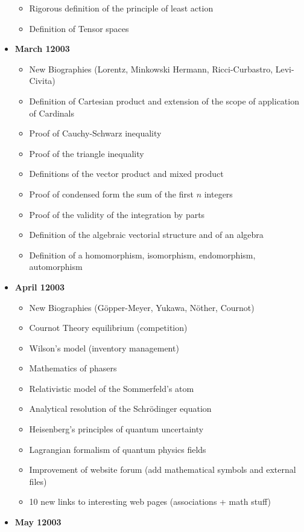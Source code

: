 \begin{itemize}
\begin{itemize}[noitemsep]
			\item Rigorous definition of the principle of least action
			\item Definition of Tensor spaces
			\end{itemize}
	\item \textbf{March 12003}
		\begin{itemize}[noitemsep]
			\item New Biographies (Lorentz, Minkowski Hermann, Ricci-Curbastro, Levi-Civita)
			\item Definition of Cartesian product and extension of the scope of application of Cardinals
			\item Proof of Cauchy-Schwarz inequality
			\item Proof of the triangle inequality 
			\item Definitions of the vector product and mixed product 
			\item Proof of condensed form the sum of the first $n$ integers 
			\item Proof of the validity of the integration by parts 
			\item Definition of the algebraic vectorial structure and of an algebra 
			\item Definition of a homomorphism, isomorphism, endomorphism, automorphism
		\end{itemize}
	\item \textbf{April 12003}
		\begin{itemize}[noitemsep]
			\item New Biographies (Göpper-Meyer, Yukawa, Nöther, Cournot)
			\item Cournot Theory equilibrium (competition)
			\item Wilson's model (inventory management)
			\item Mathematics of phasers
			\item Relativistic model of the Sommerfeld's atom
			\item Analytical resolution of the Schrödinger equation
			\item Heisenberg's principles of quantum  uncertainty
			\item Lagrangian formalism of quantum physics fields
			\item Improvement of website forum (add mathematical symbols and external files)
			\item 10 new links to interesting web pages (associations + math stuff)
		\end{itemize}
	\item \textbf{May 12003}

\end{itemize}
